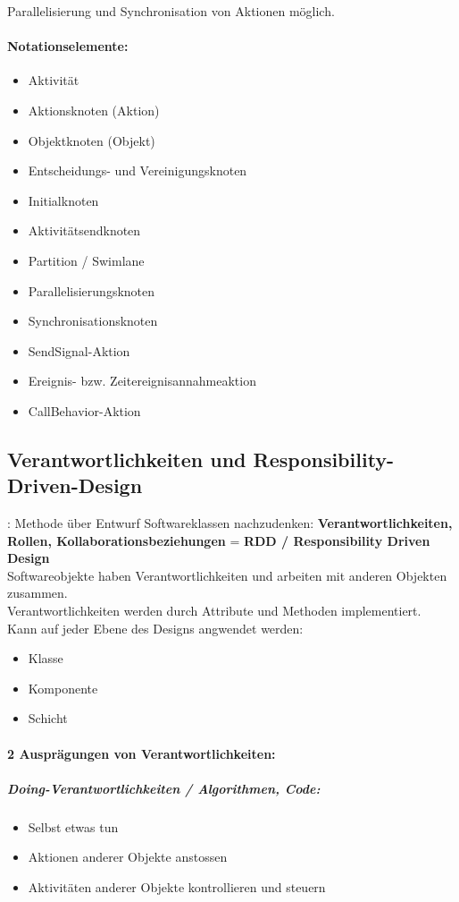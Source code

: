 \documentclass[../ZF_SWEN1.tex]{subfiles}
\begin{document}
Parallelisierung und Synchronisation von Aktionen möglich.

\paragraph{Notationselemente:}
\begin{itemize}
	\item Aktivität
	\item Aktionsknoten (Aktion)
	\item Objektknoten (Objekt)
	\item Entscheidungs- und Vereinigungsknoten
	\item Initialknoten
	\item Aktivitätsendknoten
	\item Partition / Swimlane
	\item Parallelisierungsknoten
	\item Synchronisationsknoten
	\item SendSignal-Aktion
	\item Ereignis- bzw. Zeitereignisannahmeaktion
	\item CallBehavior-Aktion
\end{itemize}


\subsection{Verantwortlichkeiten und Responsibility-Driven-Design}:
Methode über Entwurf Softwareklassen nachzudenken:
\textcolor {YellowOrange} {\textbf{Verantwortlichkeiten, Rollen, Kollaborationsbeziehungen}} = \textbf{RDD / Responsibility Driven Design}\\

Softwareobjekte haben Verantwortlichkeiten und arbeiten mit anderen Objekten zusammen.\\
Verantwortlichkeiten werden durch Attribute und Methoden implementiert.\\
Kann auf jeder Ebene des Designs angwendet werden:
\begin{itemize}
	\item Klasse
	\item Komponente
	\item Schicht
\end{itemize}


\paragraph{2 Ausprägungen von Verantwortlichkeiten:}
\subparagraph{\textcolor {BrickRed}{\textbf{Doing-Verantwortlichkeiten / Algorithmen, Code:}}}
\begin{itemize}
	\item Selbst etwas tun
	\item Aktionen anderer Objekte anstossen
	\item Aktivitäten anderer Objekte kontrollieren und steuern
\end{itemize}
\end{document}
